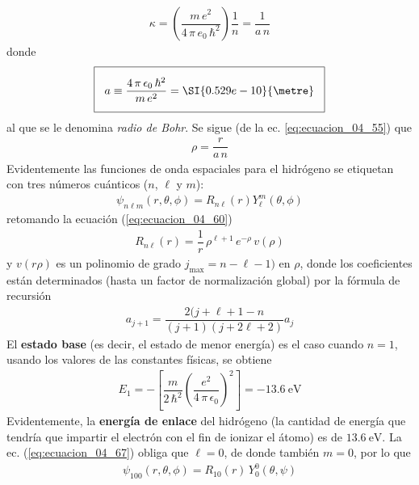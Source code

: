 \begin{align}
\kappa = \left( \dfrac{m \, e^{2}}{4 \, \pi \, e_{0} \, \hbar^{2}} \right) \dfrac{1}{n} = \dfrac{1}{a \, n}
\label{eq:ecuacion_04_71}
\end{align}
donde
\begin{align}
\setlength{\fboxsep}{3\fboxsep}\boxed{
a \equiv \dfrac{4 \, \pi \, \epsilon_{0} \, \hbar^{2}}{m \, e^{2}} = \SI{0.529e-10}{\metre}}
\label{eq:ecuacion_04_72}
\end{align}
al que se le denomina \emph{radio de Bohr}. Se sigue (de la ec. \ref{eq:ecuacion_04_55}) que
\begin{align}
\rho = \dfrac{r}{a \, n}
\label{eq:ecuacion_04_73}
\end{align}
Evidentemente las funciones de onda espaciales para el hidrógeno se etiquetan con tres números cuánticos ($n$, $\ell$ y $m$):
\begin{align}
\psi_{n \ell m} (r, \theta, \phi) =  R_{n \ell} (r) Y_{\ell}^{m} (\theta, \phi)
\label{eq:ecuacion_04_74}
\end{align}
retomando la ecuación (\ref{eq:ecuacion_04_60})
\begin{align}
R_{n \ell}(r) = \dfrac{1}{r} \, \rho^{\ell + 1} \, e^{-\rho} \, v(\rho)
\label{eq:ecuacion_04_75}
\end{align}
y $v(r\rho)$ es un polinomio de grado $j_{\text{max}} = n - \ell - 1)$ en $\rho$, donde los coeficientes están determinados (hasta un factor de normalización global) por la fórmula de recursión
\begin{align}
a_{j+1} = \dfrac{2 (j + \ell + 1 - n}{(j + 1)(j + 2 \ell + 2)} a_{j}
\label{eq:ecuacion_04_76}
\end{align}
El \textbf{estado base} (es decir, el estado de menor energía) es el caso cuando $n = 1$, usando los valores de las constantes físicas, se obtiene
\begin{align}
E_{1} = - \left[ \dfrac{m}{2 \, \hbar^{2}} \left( \dfrac{e^{2}}{4 \, \pi \, \epsilon_{0}} \right)^{2} \right] =  \SI{-13.6}{\electronvolt}
\label{eq:ecuacion_04_77}
\end{align}
Evidentemente, la \textbf{energía de enlace} del hidrógeno (la cantidad de energía que tendría que impartir el electrón con el fin de ionizar el átomo) es de $\SI{13.6}{\electronvolt}$. La ec. (\ref{eq:ecuacion_04_67}) obliga que $\ell = 0$, de donde también $m = 0$, por lo que
\begin{align}
\psi_{100} (r, \theta, \phi) = R_{10}(r) \, Y_{0}^{0} (\theta, \psi)
\label{eq:ecuacion_04_78}
\end{align}
